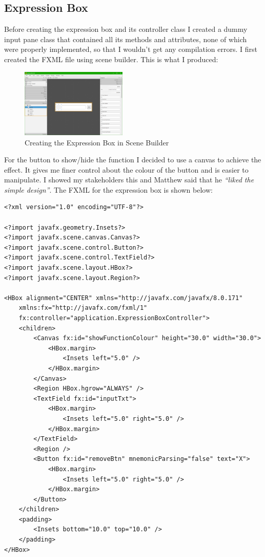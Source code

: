 \documentclass[../../../../main.tex]{subfiles}
\begin{document}
\subsection{Expression Box}
Before creating the expression box and its controller class I created a dummy input pane class that contained all its methods and attributes, none of which were properly implemented, so that I wouldn't get any compilation errors. I first created the FXML file using scene builder. This is what I produced:
\begin{figure}[H]
	\begin{center}
		\includegraphics[width=0.45\textwidth]{images/expressionBox}
	\end{center}
	\caption{Creating the Expression Box in Scene Builder}
\end{figure}
For the button to show/hide the function I decided to use a canvas to achieve the effect. It gives me finer control about the colour of the button and is easier to manipulate. I showed my stakeholders this and Matthew said that he \textit{``liked the simple design''}. The FXML for the expression box is shown below:
\begin{verbatim}
<?xml version="1.0" encoding="UTF-8"?>

<?import javafx.geometry.Insets?>
<?import javafx.scene.canvas.Canvas?>
<?import javafx.scene.control.Button?>
<?import javafx.scene.control.TextField?>
<?import javafx.scene.layout.HBox?>
<?import javafx.scene.layout.Region?>

<HBox alignment="CENTER" xmlns="http://javafx.com/javafx/8.0.171"
	xmlns:fx="http://javafx.com/fxml/1"
	fx:controller="application.ExpressionBoxController">
	<children>
		<Canvas fx:id="showFunctionColour" height="30.0" width="30.0">
			<HBox.margin>
				<Insets left="5.0" />
			</HBox.margin>
		</Canvas>
		<Region HBox.hgrow="ALWAYS" />
		<TextField fx:id="inputTxt">
			<HBox.margin>
				<Insets left="5.0" right="5.0" />
			</HBox.margin>
		</TextField>
		<Region />
		<Button fx:id="removeBtn" mnemonicParsing="false" text="X">
			<HBox.margin>
				<Insets left="5.0" right="5.0" />
			</HBox.margin>
		</Button>
	</children>
	<padding>
		<Insets bottom="10.0" top="10.0" />
	</padding>
</HBox>
\end{verbatim}
\end{document}
